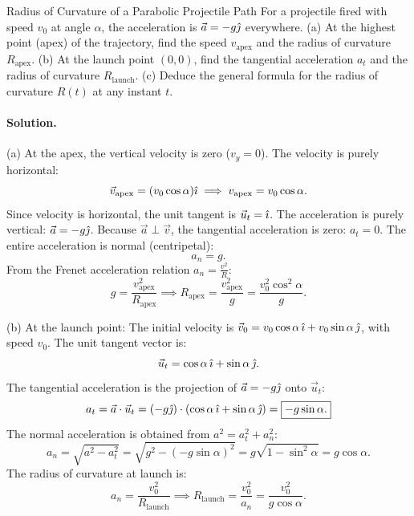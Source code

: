 \begin{workedexample}{Radius of Curvature of a Parabolic Projectile Path}
For a projectile fired with speed $v_0$ at angle $\alpha$, the acceleration is $\vec{a} = -g\hat{\jmath}$ everywhere.
(a) At the highest point (apex) of the trajectory, find the speed $v_{\text{apex}}$ and the radius of curvature $R_{\text{apex}}$.
(b) At the launch point $(0,0)$, find the tangential acceleration $a_t$ and the radius of curvature $R_{\text{launch}}$.
(c) Deduce the general formula for the radius of curvature $R(t)$ at any instant $t$.

\paragraph{Solution.}

(a) At the apex, the vertical velocity is zero ($v_y = 0$). The velocity is purely horizontal:
\[
\vec{v}_{\text{apex}} = (v_0\cos\alpha)\hat{\imath} \implies v_{\text{apex}} = v_0\cos\alpha.
\]
Since velocity is horizontal, the unit tangent is $\vec{u}_t = \hat{\imath}$.
The acceleration is purely vertical: $\vec{a} = -g\hat{\jmath}$.
Because $\vec{a}\perp\vec{v}$, the tangential acceleration is zero: $a_t = 0$.
The entire acceleration is normal (centripetal):
\[
a_n = g.
\]
From the Frenet acceleration relation $a_n = \frac{v^2}{R}$:
\[
g = \frac{v_{\text{apex}}^2}{R_{\text{apex}}} \implies \boxed{R_{\text{apex}} = \frac{v_{\text{apex}}^2}{g} = \frac{v_0^2\cos^2\alpha}{g}.}
\]

(b) At the launch point:
The initial velocity is $\vec{v}_0 = v_0\cos\alpha\,\hat{\imath} + v_0\sin\alpha\,\hat{\jmath}$, with speed $v_0$.
The unit tangent vector is:
\[
\vec{u}_t = \cos\alpha\,\hat{\imath} + \sin\alpha\,\hat{\jmath}.
\]
The tangential acceleration is the projection of $\vec{a} = -g\hat{\jmath}$ onto $\vec{u}_t$:
\[
a_t = \vec{a}\cdot\vec{u}_t = (-g\hat{\jmath})\cdot(\cos\alpha\,\hat{\imath} + \sin\alpha\,\hat{\jmath}) = \boxed{-g\sin\alpha.}
\]
The normal acceleration is obtained from $a^2 = a_t^2 + a_n^2$:
\[
a_n = \sqrt{a^2 - a_t^2} = \sqrt{g^2 - (-g\sin\alpha)^2} = g\sqrt{1 - \sin^2\alpha} = \boxed{g\cos\alpha.}
\]
The radius of curvature at launch is:
\[
a_n = \frac{v_0^2}{R_{\text{launch}}} \implies \boxed{R_{\text{launch}} = \frac{v_0^2}{a_n} = \frac{v_0^2}{g\cos\alpha}.}
\]


\end{workedexample}

